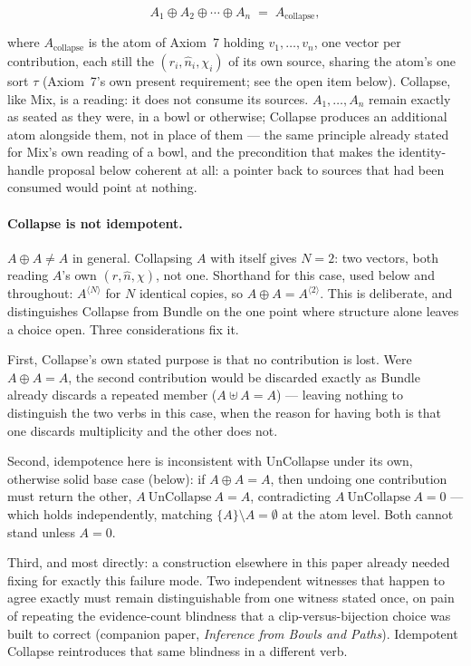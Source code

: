\documentclass[12pt, a4paper]{article}
\begin{document}
\[
A_1 \oplus A_2 \oplus \cdots \oplus A_n \;=\; A_{\text{collapse}},
\]

where $A_{\text{collapse}}$ is the atom of Axiom~7 holding
$v_1,\ldots,v_n$, one vector per contribution, each still the
$(r_i,\hat n_i,\chi_i)$ of its own source, sharing the atom's one
sort $\tau$ (Axiom~7's own present requirement; see the open item
below). Collapse, like Mix, is a reading: it does not consume
its sources. $A_1,\ldots,A_n$ remain exactly as seated as they were,
in a bowl or otherwise; Collapse produces an additional atom
alongside them, not in place of them --- the same principle already
stated for Mix's own reading of a bowl, and the precondition
that makes the identity-handle proposal below coherent at all: a
pointer back to sources that had been consumed would point at
nothing.

\paragraph{Collapse is not idempotent.} $A\oplus A \ne A$ in general.
Collapsing $A$ with itself gives $N=2$: two vectors, both reading
$A$'s own $(r,\hat n,\chi)$, not one. Shorthand for this case, used
below and throughout: $A^{\langle N\rangle}$ for $N$ identical
copies, so $A\oplus A = A^{\langle 2\rangle}$. This is deliberate, and
distinguishes Collapse from Bundle on the one point where structure
alone leaves a choice open. Three considerations fix it.

First, Collapse's own stated purpose is that no contribution is lost.
Were $A\oplus A=A$, the second contribution would be discarded
exactly as Bundle already discards a repeated member
($A\uplus A=A$) --- leaving nothing to distinguish the two verbs in
this case, when the reason for having both is that one discards
multiplicity and the other does not.

Second, idempotence here is inconsistent with UnCollapse under its
own, otherwise solid base case (below): if $A\oplus A=A$, then
undoing one contribution must return the other, $A\ \text{UnCollapse}\ A=A$,
contradicting $A\ \text{UnCollapse}\ A=0$ --- which holds independently, matching
$\{A\}\setminus A=\emptyset$ at the atom level. Both cannot stand
unless $A=0$.

Third, and most directly: a construction elsewhere in this paper
already needed fixing for exactly this failure mode. Two independent
witnesses that happen to agree exactly must remain distinguishable
from one witness stated once, on pain of repeating the
evidence-count blindness that a clip-versus-bijection choice was
built to correct (companion paper, \emph{Inference from Bowls and
Paths}). Idempotent Collapse reintroduces that same blindness in a
different verb.
\end{document}
